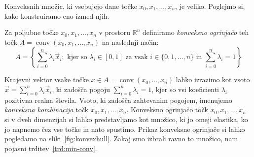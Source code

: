 \documentclass[mat1]{fmfdelo}
\newcommand{\R}{\mathbb R}
\DeclareMathOperator{\conv}{conv}
\newcommand{\0}{\underline{0}}
\begin{document}
Konveksnih množic, ki vsebujejo dane točke $x_0, x_1, \dots, x_n$, je veliko. Poglejmo si, kako konstruiramo eno izmed njih.
\begin{definicija}
Za poljubne točke $x_0, x_1, \dots, x_n$ v prostoru $\R^n$ definiramo \emph{konveksno ogrinjačo} teh točk $A = \conv(x_0, x_1, \dots, x_n)$ na naslednji način:
$$A = \left \{ \sum\limits_{i=0}^n \lambda_i \vec{x}_i; \text{ kjer so } \lambda_i \in [0, 1] \text{ za vsak } i \in \{0, 1, \dots, n \} \text{ in } \sum\limits_{i=0}^n \lambda_i = 1  \right \}$$
\end{definicija}

Krajevni vektor vsake točke $x \in A = \conv (x_0, \dots, x_n)$ lahko izrazimo kot vsoto $\vec{x} = \sum\limits_{i=0}^n \lambda_i \vec{x}_i$, ki zadošča pogoju $\sum\limits_{i=0}^n \lambda_i = 1$, kjer so vsi koeficienti $\lambda_i$ pozitivna realna števila. Vsoto, ki zadošča zahtevanim pogojem, imenujemo \emph{konveksna kombinacija} točk $x_0, x_1, \dots , x_n$. Konveksno  ogrinjačo točk $x_0, x_1, \dots, x_n$ si v dveh dimenzijah si lahko predstavljamo kot množico, ki jo omeji elastika, ko jo napnemo čez vse točke in nato spustimo. Prikaz konveksne ogrinjače si lahko pogledamo na sliki~\ref{fig:konvexhull}. Zakaj smo izbrali ravno to množico, nam pojasni trditev~\ref{trd:min-conv}.
\end{document}
